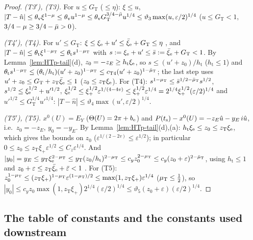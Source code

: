 \begin{proof}
\emph{\textup{(T3$'$)}, \textup{(T3)}.} For $u\le G_{\mathrm T}$ ($\le\eta$): $\xi\le u$, $|T-\hat n|\le\theta_{\mathrm v}\xi^{1-\mu}\le
\theta_{\mathrm v}u^{1-\mu}\le\theta_{\mathrm v}G_{\mathrm T}^{3/4-\bar\mu}u^{1/4}\le\vartheta_3\max(u,\varepsilon/2)^{1/4}$ ($u\le G_{\mathrm T}<1$,
$3/4-\mu\ge3/4-\bar\mu>0$).

\emph{\textup{(T4$'$)}, \textup{(T4)}.} For $u'\le G_{\mathrm T}$: $\xi\le\xi_{\mathrm e}+u'\le\bar\xi_{\mathrm e}+G_{\mathrm T}\le\eta$ , and
$|T-\hat n|\le\theta_{\mathrm t}\xi^{1-\mu_{\mathrm T}}\le\theta_{\mathrm t}s^{1-\mu_{\mathrm T}}$ with $s:=\xi_{\mathrm e}+u'\le\bar s:=\bar\xi_{\mathrm e}+G_{\mathrm T}<1$. By
Lemma~\ref{lem:HTp-tail}(d), $z_0=-z_E\ge h_{\mathrm t}\xi_{\mathrm e}$, so $s\le(u'+z_0)/h_{\mathrm t}$ ($h_{\mathrm t}\le1$) and
$\theta_{\mathrm t}s^{1-\mu_{\mathrm T}}\le(\theta_{\mathrm t}/h_{\mathrm t})(u'+z_0)^{1-\mu_{\mathrm T}}\le c_{\mathrm T4}(u'+z_0)^{1-\bar\mu_{\mathrm T}}$; the last step uses
$u'+z_0\le G_{\mathrm T}+z_{\mathrm T}\bar\xi_{\mathrm e}\le1$  ($z_0\le z_{\mathrm T}\xi_{\mathrm e}$). For \textup{(T4)}:
$s^{1-\mu_{\mathrm T}}\le\bar s^{1/2-\bar\mu_{\mathrm T}}s^{1/2}$, $s^{1/2}\le\xi_{\mathrm e}^{1/2}+u'^{1/2}$, $\xi_{\mathrm e}^{1/2}\le\xi_+^{1/2}\varepsilon^{1/(4-4v)}\le
\xi_+^{1/2}\varepsilon^{1/4}=2^{1/4}\xi_+^{1/2}(\varepsilon/2)^{1/4}$ and $u'^{1/2}\le G_{\mathrm T}^{1/4}u'^{1/4}$: $|T-\hat n|\le
\vartheta_4\max(u',\varepsilon/2)^{1/4}$.

\emph{\textup{(T5$'$)}, \textup{(T5)}.} $x^0(U)=E_Y$ ($\Theta(U)=2\pi+b_{\mathrm e}$) and $P(t_{\mathrm s})-x^0(U)=-z_E\hat u-y_E\,i\hat u$, i.e.\ $z_0=-z_E$, $y_0=-y_E$.
By Lemma~\ref{lem:HTp-tail}(d),(a): $h_{\mathrm t}\xi_{\mathrm e}\le z_0\le z_{\mathrm T}\xi_{\mathrm e}$, which gives the bounds on $z_0$
($\varepsilon^{1/(2-2v)}\le\varepsilon^{1/2}$); in particular $0\le z_0\le z_{\mathrm T}\xi_+\varepsilon^{1/2}\le C_z\varepsilon^{1/4}$. And
$|y_0|=y_E\le y_{\mathrm T}\xi_{\mathrm e}^{2-\mu_{\mathrm T}}\le y_{\mathrm T}(z_0/h_{\mathrm t})^{2-\mu_{\mathrm T}}\le c_yz_0^{2-\mu_{\mathrm T}}\le c_y(z_0+\varepsilon)^{2-\bar\mu_{\mathrm T}}$,
using $h_{\mathrm t}\le1$ and $z_0+\varepsilon\le z_{\mathrm T}\bar\xi_{\mathrm e}+\bar\varepsilon<1$ . For \textup{(T5)}:
$z_0^{1-\mu_{\mathrm T}}\le(z_{\mathrm T}\xi_+)^{1-\mu_{\mathrm T}}\varepsilon^{(1-\mu_{\mathrm T})/2}\le\max(1,z_{\mathrm T}\xi_+)\varepsilon^{1/4}$ ($\mu_{\mathrm T}\le\frac12$), so
$|y_0|\le c_yz_0\max(1,z_{\mathrm T}\xi_+)2^{1/4}(\varepsilon/2)^{1/4}\le\vartheta_5(z_0+\varepsilon)(\varepsilon/2)^{1/4}$.
\end{proof}

\subsection{The table of constants and the constants used downstream}\label{sec:HTp-table}

